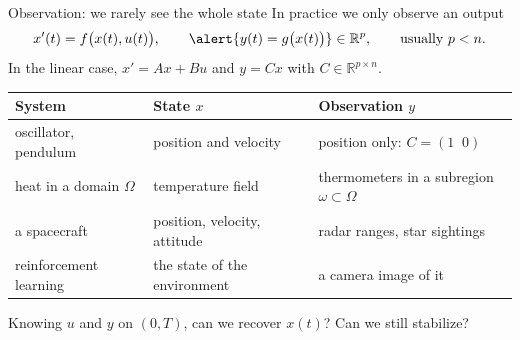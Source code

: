 \documentclass[10pt]{beamer}
\newcommand{\R}{\mathbb{R}}
\newcommand{\Kal}{\mathcal{K}}
\DeclareMathOperator{\rank}{rank}
\begin{document}
\begin{frame}{Observation: we rarely see the whole state}
\small
In practice we only \alert{observe an output}
\[
x'(t)=f\big(x(t),u(t)\big),\qquad \alert{y(t)=g\big(x(t)\big)}\in\R^p,\qquad\text{usually } p<n .
\]
In the linear case, $x'=Ax+Bu$ and $y=Cx$ with $C\in\R^{p\times n}$.

\medskip
\footnotesize
\renewcommand{\arraystretch}{1.25}
\begin{tabularx}{\textwidth}{@{}>{\raggedright\arraybackslash}p{} >{\raggedright\arraybackslash}p{} >{\raggedright\arraybackslash}X@{}}
\toprule
\textbf{System} & \textbf{State $x$} & \textbf{Observation $y$} \\
\midrule
oscillator, pendulum & position and velocity & position only: $C=(1\;\;0)$ \\
heat in a domain $\Omega$ & temperature field & thermometers in a subregion $\omega\subset\Omega$ \\
a spacecraft & position, velocity, attitude & radar ranges, star sightings \\
reinforcement learning & the state of the environment & a camera image of it \\
\bottomrule
\end{tabularx}

\bigskip
\begin{center}
\normalsize\alert{Knowing $u$ and $y$ on $(0,T)$, can we recover $x(t)$? Can we still stabilize?}
\end{center}
\end{frame}



\end{document}
